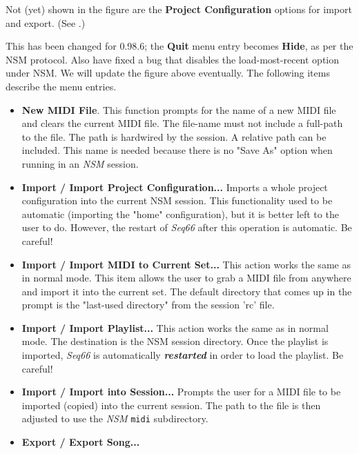    Not (yet) shown in the figure are the \textbf{Project Configuration}
   options for import and export.
   (See .)

   This has been changed for 0.98.6; the \textbf{Quit} menu entry becomes
   \textbf{Hide}, as per the NSM protocol.  Also have fixed a bug that disables
   the load-most-recent option under NSM.
   We will update the figure above eventually.
   The following items describe the menu entries.

   \begin{itemize}
      \item \textbf{New MIDI File}.
         This function prompts for the name of a
         new MIDI file and clears the current MIDI file.  The file-name must not
         include a full-path to the file.  The path is hardwired by the
         session.  A relative path can be included.  This name is needed
         because there is no "Save As" option when running in an \textsl{NSM}
         session.
      \item \textbf{Import / Import Project Configuration...}
         Imports a whole project configuration into the current NSM session.
         This functionality used to be automatic (importing the "home"
         configuration), but it is better left to the user to do.
         However, the restart of \textsl{Seq66} after this operation is
         automatic.  Be careful!
      \item \textbf{Import / Import MIDI to Current Set...}
         This action works the same as in normal mode.
         This item allows the user to grab a MIDI file from anywhere and import
         it into the current set.
         The default directory that comes up in the
         prompt is the "last-used directory" from the session 'rc' file.
      \item \textbf{Import / Import Playlist...}
         This action works the same as in normal mode.
         The destination is the NSM session directory.
         Once the playlist is imported,
         \textsl{Seq66} is automatically \textsl{\textbf{restarted}}
         in order to load the playlist.
         Be careful!
      \item \textbf{Import / Import into Session...}
         Prompts the user for a MIDI file to
         be imported (copied) into the current session.  The path to the file
         is then adjusted to use the \textsl{NSM} \texttt{midi} subdirectory.
      \item \textbf{Export / Export Song...}

\end{itemize}
